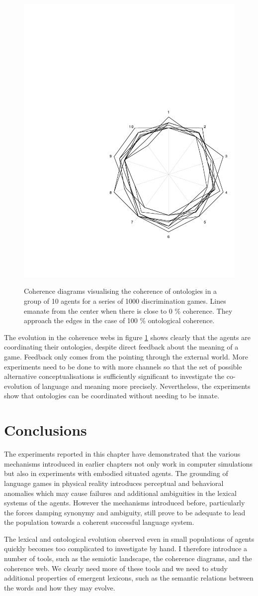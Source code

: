 \begin{figure}
{\includegraphics[width=.32\textwidth]{chap7/figs/com10}}

\caption{ \label{cohweb} Coherence diagrams visualising
the coherence of ontologies in a group of 10 agents for
a series of 1000 discrimination games. Lines emanate 
from the center when there is close to 0 \% coherence. They approach the
edges in the case of 100 \% ontological coherence.}
\end{figure}

The evolution in the coherence webs in figure 
\ref{cohweb} shows clearly that the agents are 
coordinating their ontologies, despite direct feedback 
about the meaning of a game. Feedback only comes from 
the pointing through the external world. More experiments
need to be done to with more channels so that the 
set of possible alternative conceptualisations is 
sufficiently significant to investigate the co-evolution 
of language and meaning more precisely. Nevertheless, 
the experiments show that ontologies can be coordinated
without needing to be innate. 

\section{Conclusions}

The experiments reported in this chapter have
demonstrated that 
the various mechanisms introduced in earlier chapters
not only work in computer simulations but also in 
experiments with embodied situated agents. 
The grounding of language games in physical 
reality introduces perceptual and behavioral anomalies 
which may cause failures and additional ambiguities
in the lexical systems of the agents. However the 
mechanisms introduced before, particularly the 
forces damping synonymy and ambiguity, still prove to 
be adequate to lead the population towards a 
coherent successful language system. 

The lexical and ontological evolution observed even 
in small populations of agents quickly becomes 
too complicated to investigate by hand. I therefore
introduce a number of tools, such as the semiotic
landscape, the coherence diagrams, and the coherence
web. We clearly need more of these tools and we 
need to study additional properties of emergent 
lexicons, such as the semantic relations between 
the words and how they may evolve. 



